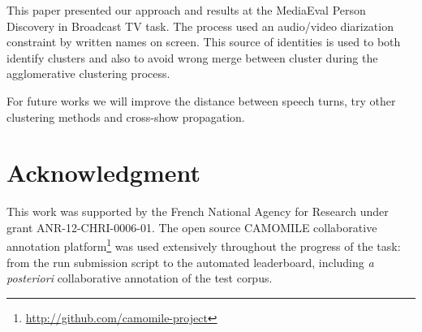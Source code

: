 \documentclass{acm_proc_article-me}
\begin{document}
This paper presented our approach and results at the MediaEval Person Discovery in Broadcast TV task. The process used an audio/video diarization constraint by written names on screen. 
This source of identities is used to both identify clusters and also to avoid wrong merge between cluster during the agglomerative clustering process.

For future works we will improve the distance between speech turns, try other clustering methods and cross-show propagation. 


\section{Acknowledgment}

This work was supported by the French National Agency for Research under grant ANR-12-CHRI-0006-01.
The open source CAMOMILE collaborative annotation platform\footnote{\url{http://github.com/camomile-project}} was used extensively throughout the progress of the task: from the run submission script to the automated leaderboard, including \emph{a posteriori} collaborative annotation of the test corpus.




\end{document}
